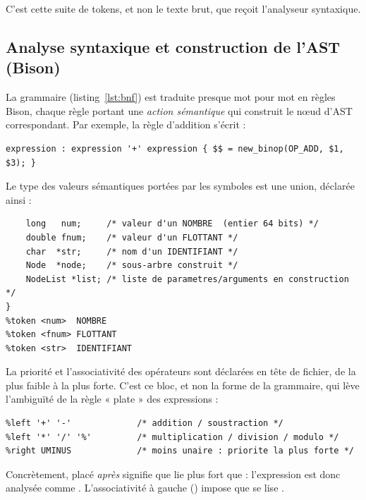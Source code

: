 C'est cette suite de tokens, et non le texte brut, que reçoit l'analyseur
syntaxique.

\subsection{Analyse syntaxique et construction de l'AST (Bison)}

La grammaire (listing~\ref{lst:bnf}) est traduite presque mot pour mot en règles
Bison, chaque règle portant une \emph{action sémantique} qui construit le n\oe ud
d'AST correspondant. Par exemple, la règle d'addition s'écrit :

\begin{lstlisting}[style=gram,caption={Action sémantique d'une règle (extrait de \code{ilang.y}).}]
expression : expression '+' expression { $$ = new_binop(OP_ADD, $1, $3); }
\end{lstlisting}

Le type des valeurs sémantiques portées par les symboles est une union, déclarée
ainsi :

\begin{lstlisting}[style=gram,caption={Union sémantique et déclaration des tokens (extrait de \code{ilang.y}).}]
%union {
    long   num;     /* valeur d'un NOMBRE  (entier 64 bits) */
    double fnum;    /* valeur d'un FLOTTANT */
    char  *str;     /* nom d'un IDENTIFIANT */
    Node  *node;    /* sous-arbre construit */
    NodeList *list; /* liste de parametres/arguments en construction */
}
%token <num>  NOMBRE
%token <fnum> FLOTTANT
%token <str>  IDENTIFIANT
\end{lstlisting}

La priorité et l'associativité des opérateurs sont déclarées en tête de fichier,
de la plus faible à la plus forte. C'est ce bloc, et non la forme de la grammaire,
qui lève l'ambiguïté de la règle « plate » des expressions :

\begin{lstlisting}[style=gram,caption={Déclarations de priorité (extrait de \code{ilang.y}).}]
%left EQ NE LT GT LE GE   /* comparaisons : priorite la plus faible */
%left '+' '-'             /* addition / soustraction */
%left '*' '/' '%'         /* multiplication / division / modulo */
%right UMINUS             /* moins unaire : priorite la plus forte */
\end{lstlisting}

Concrètement,  placé \emph{après}  signifie que
\code{*} lie plus fort que \code{+} : l'expression  est donc
analysée comme . L'associativité à gauche ()
impose que  se lise .

